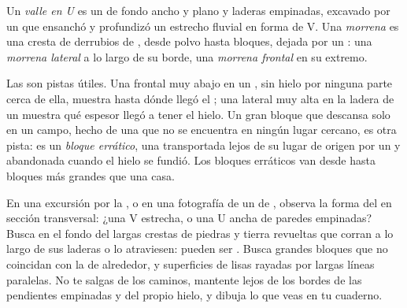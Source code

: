 \begin{definition}\label{def:g8:ice-on-earth:glacial-landforms}
Un \emph{valle en U} es un  de fondo ancho y plano y
laderas empinadas, excavado por un  que ensanchó y profundizó un
estrecho  fluvial en forma de V. Una \emph{morrena} es
una cresta de derrubios de , desde polvo hasta bloques, dejada por un
: una \emph{morrena lateral} a lo largo de su borde, una
\emph{morrena frontal} en su extremo.
\end{definition}

Las  son pistas útiles. Una  frontal muy abajo en un ,
sin hielo por ninguna parte cerca de ella, muestra hasta dónde llegó el
; una  lateral muy alta en la ladera de un  muestra qué
espesor llegó a tener el hielo. Un gran bloque que descansa solo en un
campo, hecho de una  que no se encuentra en ningún lugar cercano, es
otra pista: es un \emph{bloque errático}, una  transportada lejos de
su lugar de origen por un  y abandonada cuando el hielo se fundió.
Los bloques erráticos van desde  hasta bloques más grandes
que una casa.

\begin{inthefield}
En una excursión por la , o en una fotografía de un  de
, observa la forma del  en sección transversal: ¿una V
estrecha, o una U ancha de paredes empinadas? Busca en el fondo del 
largas crestas de piedras y tierra revueltas que corran a lo largo de sus
laderas o lo atraviesen: pueden ser . Busca grandes bloques que no
coincidan con la  de alrededor, y superficies de  lisas rayadas
por largas líneas paralelas. No te salgas de los caminos, mantente lejos
de los bordes de las pendientes empinadas y del propio hielo, y dibuja lo
que veas en tu cuaderno.
\end{inthefield}

